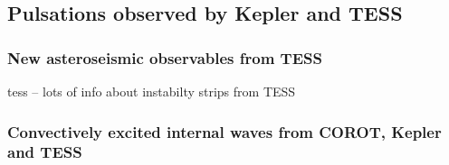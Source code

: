 {\color{blue}
\subsection{Pulsations observed by Kepler and TESS}



\subsubsection{New asteroseismic observables from TESS}

tess -- lots of info about instabilty strips from TESS

\subsubsection{Convectively excited internal waves from COROT, Kepler and TESS}


}